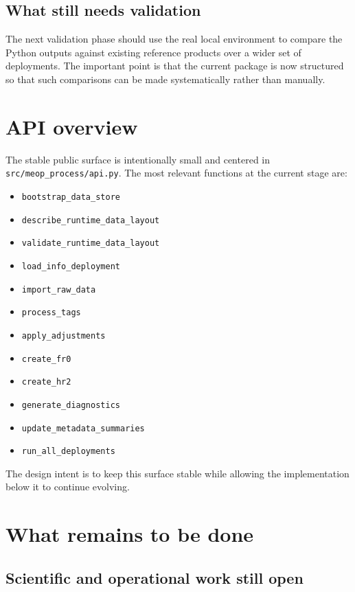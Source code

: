 \documentclass[11pt,a4paper]{article}
\newcommand{\pkg}[1]{\texttt{#1}}
\begin{document}
\subsection{What still needs validation}

The next validation phase should use the real local environment to compare the Python outputs against existing reference products over a wider set of deployments. The important point is that the current package is now structured so that such comparisons can be made systematically rather than manually.

\section{API overview}

The stable public surface is intentionally small and centered in \pkg{src/meop\_process/api.py}. The most relevant functions at the current stage are:

\begin{itemize}[leftmargin=1.5em]
  \item \pkg{bootstrap\_data\_store}
  \item \pkg{describe\_runtime\_data\_layout}
  \item \pkg{validate\_runtime\_data\_layout}
  \item \pkg{load\_info\_deployment}
  \item \pkg{import\_raw\_data}
  \item \pkg{process\_tags}
  \item \pkg{apply\_adjustments}
  \item \pkg{create\_fr0}
  \item \pkg{create\_hr2}
  \item \pkg{generate\_diagnostics}
  \item \pkg{update\_metadata\_summaries}
  \item \pkg{run\_all\_deployments}
\end{itemize}

The design intent is to keep this surface stable while allowing the implementation below it to continue evolving.

\section{What remains to be done}

\subsection{Scientific and operational work still open}
\end{document}
